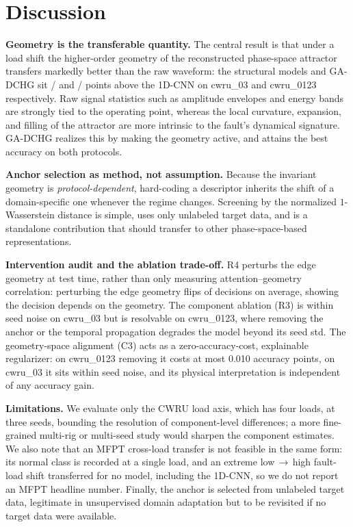 \section{Discussion}
\label{sec:discussion}

\textbf{Geometry is the transferable quantity.} The central result is that under
a load shift the higher-order geometry of the reconstructed phase-space attractor
transfers markedly better than the raw waveform: the structural models and
GA-DCHG sit \GapCZeroThreeDynhg{}/\GapCZeroThreeGad{} and
\GapCZeroOneTwoThreeDynhg{}/\GapCZeroOneTwoThreeGad{} points above the 1D-CNN on
cwru\_03 and cwru\_0123 respectively. Raw signal statistics such as amplitude
envelopes and energy bands are strongly tied to the operating point, whereas the local
curvature, expansion, and filling of the attractor are more intrinsic to the
fault's dynamical signature. GA-DCHG realizes this by making the geometry active,
and attains the best accuracy on both protocols.

\textbf{Anchor selection as method, not assumption.} Because the invariant
geometry is \emph{protocol-dependent}, hard-coding a descriptor inherits the
shift of a domain-specific one whenever the regime changes. Screening by the
normalized $1$-Wasserstein distance is simple, uses only unlabeled target data,
and is a standalone contribution that should transfer to other phase-space-based
representations.

\textbf{Intervention audit and the ablation trade-off.} R4 perturbs the edge
geometry at test time, rather than only measuring attention--geometry
correlation: perturbing the edge geometry flips
\FlipScale{} of decisions on average, showing the decision depends on the geometry.
The component ablation (R3) is within seed noise on
cwru\_03 but is resolvable on cwru\_0123, where removing the anchor or the
temporal propagation degrades the model beyond its seed std. The geometry-space
alignment (C3) acts as a zero-accuracy-cost, explainable regularizer: on
cwru\_0123 removing it costs at most 0.010 accuracy points, on cwru\_03 it
sits within seed noise, and its physical interpretation is independent of any
accuracy gain.

\textbf{Limitations.} We evaluate only the CWRU load axis, which has four loads,
at three seeds, bounding the resolution of component-level differences; a more
fine-grained multi-rig or multi-seed study would sharpen the component estimates.
We also note that an MFPT cross-load transfer is not feasible in the same form:
its normal class is recorded at a single load, and an extreme low\,$\rightarrow$\,high
fault-load shift transferred for no model, including the 1D-CNN, so we do not
report an MFPT headline number. Finally, the anchor is selected from unlabeled
target data, legitimate in unsupervised domain adaptation but to be revisited if
no target data were available.


